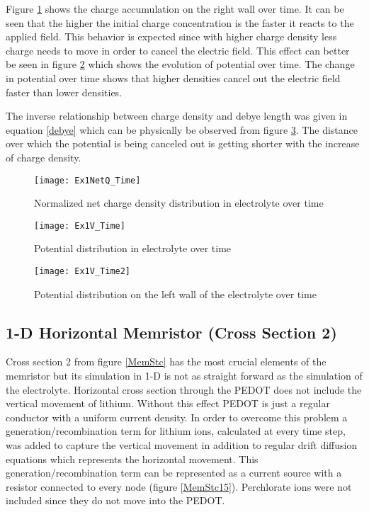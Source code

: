 Figure \ref{ElectrolyteQzoom} shows the charge accumulation on the right wall over time. It can be seen that the higher the initial charge concentration is the faster it reacts to the applied field. This behavior is expected since with higher charge density less charge needs to move in order to cancel the electric field. This effect can better be seen in figure \ref{ElectrolyteV} which shows the evolution of potential over time. The change in potential over time shows that higher densities cancel out the electric field faster than lower densities.

The inverse relationship between charge density and debye length was given in equation \ref{debye} which can be physically be observed from figure  \ref{ElectrolyteV2}. The distance over which the potential is being canceled out is getting shorter with the increase of charge density.  

 
\begin{landscape}
\begin{figure}[!htp]
\centering
\texttt{[image: Ex1NetQ\_Time]}
\caption{Normalized net charge density distribution in electrolyte over time} 
\label{ElectrolyteQzoom}
\end{figure}
\end{landscape}

\begin{landscape}
\begin{figure}[!htp]
\centering
\texttt{[image: Ex1V\_Time]}
\caption{Potential distribution in electrolyte over time} 
\label{ElectrolyteV}
\end{figure}
\end{landscape}

 
\begin{landscape}
\begin{figure}[!htp]
\centering
\texttt{[image: Ex1V\_Time2]}
\caption{Potential distribution on the left wall of the electrolyte over time} 
\label{ElectrolyteV2}
\end{figure}
\end{landscape}

\clearpage
\subsection{1-D Horizontal Memristor (Cross Section 2)}

Cross section 2 from figure \ref{MemStc} has the most crucial elements of the memristor but its simulation in 1-D is not as straight forward as the simulation of the electrolyte. Horizontal cross section through the PEDOT does not include the vertical movement of lithium. Without this effect PEDOT is just a regular conductor with a uniform current density. In order to overcome this problem a generation/recombination term for lithium ions, calculated at every time step, was added to capture the vertical movement in addition to regular drift diffusion equations which represents the horizontal movement. This generation/recombination term can be represented as a current source with a resistor connected to every node (figure \ref{MemStc15}). Perchlorate ions were not included since they do not move into the PEDOT.

